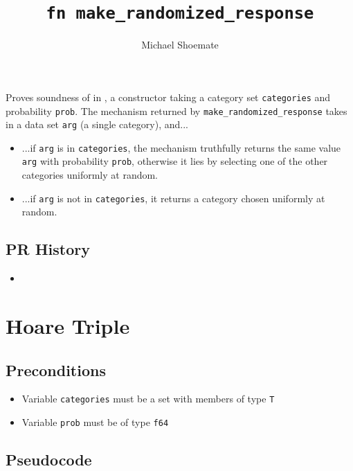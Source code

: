 \documentclass{article}
\title{\texttt{fn make\_randomized\_response}}
\author{Michael Shoemate}
\begin{document}
\maketitle

\contrib

Proves soundness of  in ,
a constructor taking a category set \texttt{categories} and probability \texttt{prob}.
The mechanism returned by \texttt{make\_randomized\_response} takes in a data set \texttt{arg} (a single category), and...

\begin{itemize}
    \item ...if \texttt{arg} is in \texttt{categories},
    the mechanism truthfully returns the same value \texttt{arg} with probability \texttt{prob},
    otherwise it lies by selecting one of the other categories uniformly at random.
    \item ...if \texttt{arg} is not in \texttt{categories}, 
    it returns a category chosen uniformly at random.
\end{itemize}

\subsection*{PR History}
\begin{itemize}
    \item {}
\end{itemize}

\section{Hoare Triple}

\subsection*{Preconditions}
\begin{itemize}
    \item Variable \texttt{categories} must be a set with members of type \texttt{T}
    \item Variable \texttt{prob} must be of type \texttt{f64}
\end{itemize}

\subsection*{Pseudocode}

\end{document}
